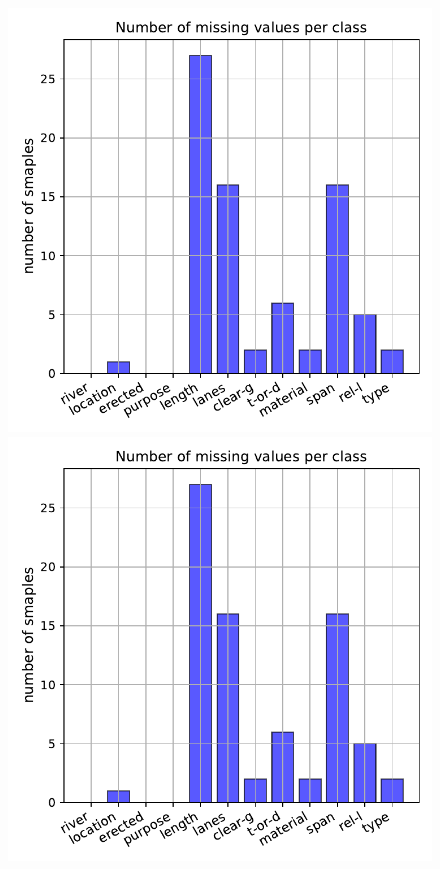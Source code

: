 \documentclass[11pt]{article}
\begin{document}
\begin{figure}
\begin{minipage}[l]{0.3\textwidth}
\includegraphics[width=1\linewidth]{bridges/bridges_missing.pdf}
\end{minipage}
\begin{minipage}[l]{0.3\textwidth}
\includegraphics[width=1\linewidth]{bridges/bridges_missing.pdf}

\end{minipage}
\end{figure}
\end{document}

